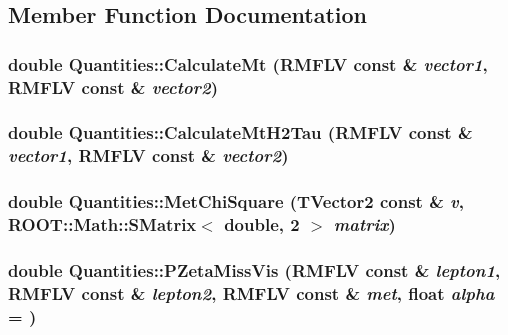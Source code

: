 \subsection{Member Function Documentation}
\hypertarget{classQuantities_a0c2473ce5b63c18bcefad649abccc71a}{
\subsubsection[{CalculateMt}]{\setlength{\rightskip}{0pt plus 5cm}double Quantities::CalculateMt (RMFLV const \& {\em vector1}, \/  RMFLV const \& {\em vector2})}}
\label{classQuantities_a0c2473ce5b63c18bcefad649abccc71a}
\hypertarget{classQuantities_a357019790083b57fd3a33c0aab74b005}{
\subsubsection[{CalculateMtH2Tau}]{\setlength{\rightskip}{0pt plus 5cm}double Quantities::CalculateMtH2Tau (RMFLV const \& {\em vector1}, \/  RMFLV const \& {\em vector2})}}
\label{classQuantities_a357019790083b57fd3a33c0aab74b005}
\hypertarget{classQuantities_af20e98e334d2757566a5a0b85949f130}{
\subsubsection[{MetChiSquare}]{\setlength{\rightskip}{0pt plus 5cm}double Quantities::MetChiSquare (TVector2 const \& {\em v}, \/  ROOT::Math::SMatrix$<$ double, 2 $>$ {\em matrix})}}
\label{classQuantities_af20e98e334d2757566a5a0b85949f130}
\hypertarget{classQuantities_a70c44bbcb5e39b7cac66c77e0a13752a}{
\subsubsection[{PZetaMissVis}]{\setlength{\rightskip}{0pt plus 5cm}double Quantities::PZetaMissVis (RMFLV const \& {\em lepton1}, \/  RMFLV const \& {\em lepton2}, \/  RMFLV const \& {\em met}, \/  float {\em alpha} = {})}}
